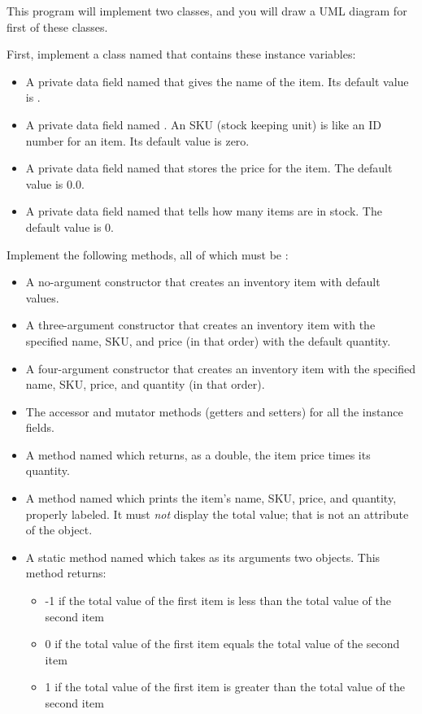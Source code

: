 \begin{exercise}
This program will implement two classes, and you will draw a UML diagram for first of these classes.

First, implement a class named  that contains these instance variables:

\begin{itemize}
    \item A private  data field named  that gives the name of the item. Its default value is .
    \item A private  data field named . An SKU (stock keeping unit) is like an ID number for an item. Its default value is zero.
    \item A private  data field named  that stores the price for the item. The default value is 0.0.
    \item A private  data field named  that tells how many items are in stock. The default value is 0.
\end{itemize}

Implement the following methods, all of which must be :

\begin{itemize}
    \item A no-argument constructor that creates an inventory item with default values.
    \item A three-argument constructor that creates an inventory item with the specified name, SKU, and price (in that order) with the default quantity.
    \item A four-argument constructor that creates an inventory item with the specified name, SKU, price, and quantity (in that order).
    \item The accessor and mutator methods (getters and setters) for all the instance fields.
    \item A method named  which returns, as a double, the item price times its quantity.
    \item A method named  which prints the item's name, SKU, price, and quantity, properly labeled. It must {\em not} display the total value; that is not an attribute of the object.
    \item A static method named  which takes as its arguments two  objects. This method returns:
        \begin{itemize}
            \item -1 if the total value of the first item is less than the total value of the second item
            \item 0 if the total value of the first item equals the total value of the second item
            \item 1 if the total value of the first item is greater than the total value of the second item
        \end{itemize}
        

\end{itemize}
\end{exercise}
